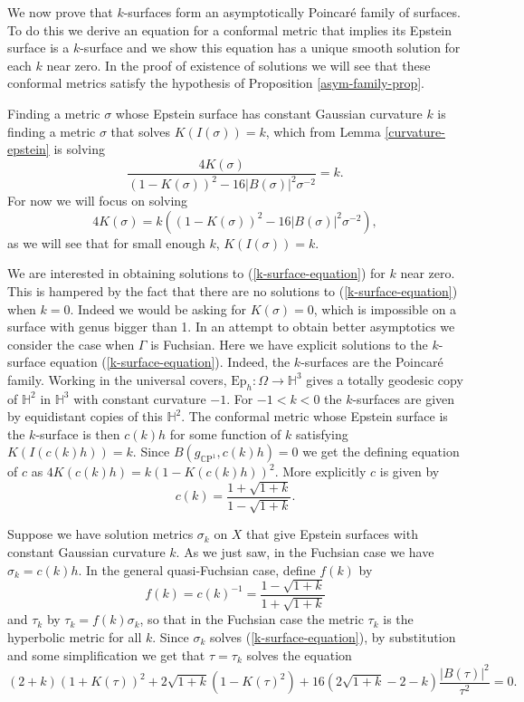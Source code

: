 \documentclass{amsart}
\newcommand{\CP}{\mathbb{C}\mathrm{P}}
\renewcommand{\H}{\mathbb{H}}
\begin{document}
We now prove that $k$-surfaces form an asymptotically Poincar\'e family of surfaces. 
To do this we derive an equation for a conformal metric that implies its Epstein surface is a $k$-surface and we show this equation has a unique smooth solution for each $k$ near zero. 
In the proof of existence of solutions we will see that these conformal metrics satisfy the hypothesis of Proposition \ref{asym-family-prop}. 



Finding a metric $\sigma$ whose Epstein surface has constant Gaussian curvature $k$ is finding a metric $\sigma$ that solves $K(I(\sigma)) = k$, which from Lemma \ref{curvature-epstein} is solving
\[
\frac{4K(\sigma)}{(1-K(\sigma))^2 - 16|B(\sigma)|^2\sigma^{-2}} = k.
\]
For now we will focus on solving
\begin{equation}
\label{k-surface-equation}
4K(\sigma) = k \left((1-K(\sigma))^2 - 16|B(\sigma)|^2\sigma^{-2} \right),
\end{equation}
as we will see that for small enough $k$, $K(I(\sigma)) = k$.

We are interested in obtaining solutions to (\ref{k-surface-equation}) for $k$ near zero. 
This is hampered by the fact that there are no solutions to (\ref{k-surface-equation}) when $k = 0$. 
Indeed we would be asking for $K(\sigma)=0$, which is impossible on a surface with genus bigger than 1. 
In an attempt to obtain better asymptotics we consider the case when $\Gamma$ is Fuchsian. 
Here we have explicit solutions to the $k$-surface equation (\ref{k-surface-equation}).
Indeed, the $k$-surfaces are the Poincar\'e family. 
Working in the universal covers, $\mathrm{Ep}_h : \Omega \to \H^3$ gives a totally geodesic copy of $\H^2$ in $\H^3$ with constant curvature $-1$. 
For $-1<k<0$  the $k$-surfaces are given by equidistant copies of this $\H^2$. 
The conformal metric whose Epstein surface is the $k$-surface is then $c(k)h$ for some function of $k$ satisfying $K(I(c(k)h)) = k$. 
Since $B(g_{\CP^1},c(k)h) = 0$ we get the defining equation of $c$ as $4K(c(k)h) = k(1 - K(c(k)h))^2$.
More explicitly $c$ is given by
\[
c(k) = \frac{1+\sqrt{1+k}}{1-\sqrt{1+k}}.
\]


Suppose we have solution metrics $\sigma_k$  on $X$ that give Epstein surfaces with constant Gaussian curvature $k$. 
As we just saw, in the Fuchsian case we have $\sigma_k = c(k) h$.  
In the general quasi-Fuchsian case, define $f(k)$ by 
\[
f(k) = c(k)^{-1} = \frac{1-\sqrt{1+k}}{1+\sqrt{1+k}}
\] 
and $\tau_k$ by $\tau_k = f(k)\sigma_k$, so that in the Fuchsian case the metric $\tau_k$ is the hyperbolic metric for all $k$. 
Since $\sigma_k$ solves (\ref{k-surface-equation}), by substitution and some simplification we get that $\tau = \tau_k$ solves the equation 
\begin{equation}
\label{scaled-equation}
(2+k)(1+K(\tau))^2 + 2\sqrt{1+k}\left(1-K(\tau)^2\right) + 16\left(2\sqrt{1+k} - 2 - k  \right)\frac{|B(\tau)|^2}{\tau^2} = 0.
\end{equation}
\end{document}
